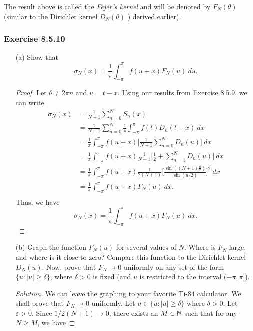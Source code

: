 The result above is called the \textit{Fej\'{e}r's kernel} and will be denoted by \( F_{N}(\theta)  \) (similar to the Dirichlet kernel \( D_{N}(\theta)  \) ) derived earlier).
\subsubsection{Exercise 8.5.10} 
\begin{enumerate}
    \item[(a)] Show that 
        \[  \sigma_{N}(x) = \frac{ 1 }{ \pi  } \int_{ -\pi  }^{ \pi  } f(u+x) F_{N}(u)   \ du. \]
        \begin{proof}
        Let \( \theta \neq 2 \pi n \) and \( u = t - x   \). Using our results from Exercise 8.5.9, we can write 
        \begin{align*}
          \sigma_{N}(x)   &= \frac{ 1 }{ N+1 } \sum_{ n=0 }^{ N } S_{n}(x) \\
                    &= \frac{ 1 }{ N+1 } \sum_{ n=0  }^{ N } \frac{ 1 }{ \pi  } \int_{ -\pi  }^{ \pi  } f(t) D_{n}(t-x) \ dx \\ 
                    &= \frac{ 1 }{ \pi  } \int_{ -\pi  }^{ \pi  } f(u+x) \Big[  \frac{ 1  }{ N+1 } \sum_{ n=0  }^{ N  } D_{n}(u) \Big]  \ dx \\
                    &= \frac{ 1 }{ \pi  } \int_{ -\pi  }^{ \pi  } f(u+x) \frac{ 1 }{ N+1 } \Big[ \frac{ 1 }{ 2 } + \sum_{ n=1 }^{ N } D_{n}(u) \Big]   \ dx \\
                    &= \frac{ 1 }{ \pi  } \int_{ -\pi  }^{ \pi  } f(u+x) \frac{ 1 }{ 2(N+1) } \Big[\frac{ \sin((N+1)\frac{ u }{ 2 } ) }{ \sin(u/2) } \Big]^{2}  \ dx \\
                    &= \frac{ 1 }{ \pi  } \int_{ -\pi  }^{ \pi  } f(u+x) F_{N}(u) \ dx. \\
        \end{align*}
        Thus, we have
        \[  \sigma_{N}(x) = \frac{ 1 }{ \pi } \int_{ -\pi  }^{ \pi  } f(u+x) F_{N}(u) \ dx. \]
        \end{proof}
    \item[(b)] Graph the function \( F_{N}(u)  \) for several values of \( N \). Where is \( F_{N} \) large, and where is it close to zero? Compare this function to the Dirichlet kernel \( D_{N}(u)  \). Now, prove that \( F_{N} \to  0  \) uniformly on any set of the form \( \{ u: | u  | \geq \delta \}  \), where \( \delta > 0  \) is fixed (and \( u  \) is restricted to the interval \( (-\pi,\pi] \)). 
        \begin{proof}[Solution]
        We can leave the graphing to your favorite Ti-84 calculator. We shall prove that \( F_{N} \to 0  \) uniformly. Let \( u \in \{ u: | u  | \geq \delta \}  \) where \( \delta > 0  \). Let \( \varepsilon > 0  \). Since \( 1 / 2 (N+1) \to 0  \), there exists an \( M \in \mathbb{N}  \) such that for any \( N \geq M  \), we have 

\end{proof}
\end{enumerate}
